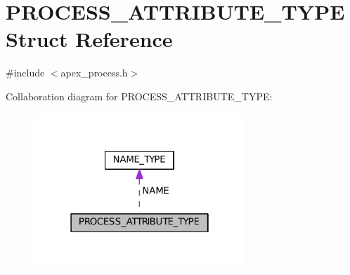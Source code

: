 \hypertarget{structPROCESS__ATTRIBUTE__TYPE}{}\section{P\+R\+O\+C\+E\+S\+S\+\_\+\+A\+T\+T\+R\+I\+B\+U\+T\+E\+\_\+\+T\+Y\+PE Struct Reference}
\label{structPROCESS__ATTRIBUTE__TYPE}


{\ttfamily \#include $<$apex\+\_\+process.\+h$>$}



Collaboration diagram for P\+R\+O\+C\+E\+S\+S\+\_\+\+A\+T\+T\+R\+I\+B\+U\+T\+E\+\_\+\+T\+Y\+PE\+:
\nopagebreak
\begin{figure}[H]
\begin{center}
\leavevmode
\includegraphics[width=226pt]{structPROCESS__ATTRIBUTE__TYPE__coll__graph}
\end{center}
\end{figure}
